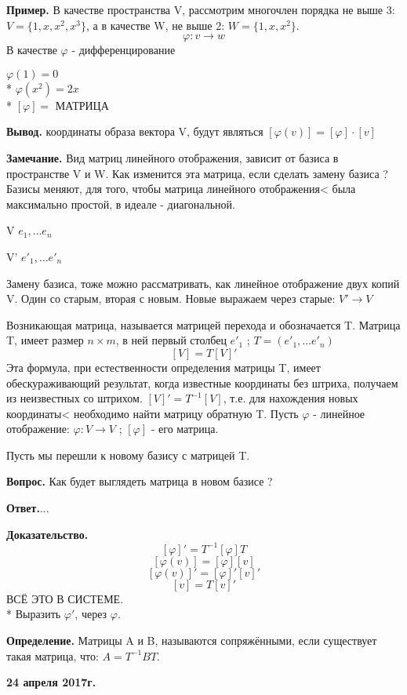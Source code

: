 \documentclass{article}
\begin{document}
{\bf Пример.} В качестве пространства V, рассмотрим многочлен порядка не выше 3: $V=\{1, x, x^2, x^3\}$, а в качестве W, не выше 2: $W=\{1, x, x^2\}$.
$$\varphi:v\to w$$
В качестве $\varphi$ - дифференцирование

$\varphi(1)=0$\\*
$\varphi(x^2)=2x$\\*
$[\varphi]=$ МАТРИЦА

{\bf Вывод.} координаты образа вектора V, будут являться $[\varphi(v)]=[\varphi]\cdot[v]$

{\bf Замечание.} Вид матриц линейного отображения, зависит от базиса в пространстве V и W. Как изменится эта матрица, если сделать замену базиса ? Базисы меняют, для того, чтобы матрица линейного отображения< была максимально простой, в идеале - диагональной.

V   $ e_1,\ldots e_n$

V'   $ e'_1,\ldots e'_n$

Замену базиса, тоже можно рассматривать, как линейное отображение двух копий V. Один со старым, вторая с новым. Новые выражаем через старые: $V'\to V$

Возникающая матрица, называется матрицей перехода и обозначается T. Матрица T, имеет размер $n\times m$, в ней первый столбец $e'_1 $ ; $ T=(e'_1,\ldots e'_n)$
$$[V]=T[V]'$$
Эта формула, при естественности определения матрицы T, имеет обескураживающий результат, когда известные координаты без штриха, получаем из неизвестных со штрихом. $[V]'=T^{-1}[V]$, т.е. для нахождения новых координаты< необходимо найти матрицу обратную T. Пусть $\varphi$ - линейное отображение: $\varphi:V\to V $ ; $ [\varphi]$ - его матрица.

Пусть мы перешли к новому базису с матрицей T.

{\bf Вопрос.} Как будет выглядеть матрица в новом базисе ?

{\bf Ответ.}...

{\bf Доказательство.} $$[\varphi]'=T^{-1}[\varphi]T$$
$$[\varphi(v)]=[\varphi][v]$$
$$[\varphi(v)]'=[\varphi]'[v]'$$
$$[v]=T[v]'$$
ВСЁ ЭТО В СИСТЕМЕ.\\*
Выразить $\varphi'$, через $\varphi$.

{\bf Определение.} Матрицы A и B, называются сопряжёнными, если существует такая матрица, что: $A=T^{-1}BT$.

\textbf {24 апреля 2017г.}
\end{document}
